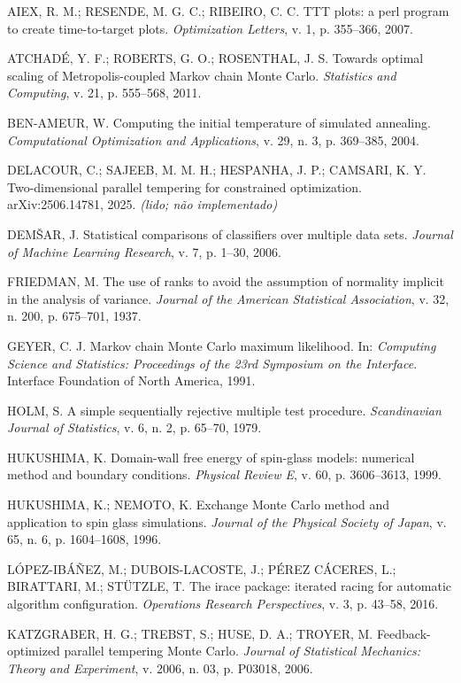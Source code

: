\documentclass[10pt,a4paper]{article}
\newenvironment{referencias}{\small\newcommand{\refitem}{\par\hangindent=7mm\hangafter=1 }}{\par}
\begin{document}
\begin{referencias}
 AIEX, R. M.; RESENDE, M. G. C.; RIBEIRO, C. C. TTT plots: a perl program to create time-to-target plots. \textit{Optimization Letters}, v. 1, p. 355–366, 2007.

 ATCHADÉ, Y. F.; ROBERTS, G. O.; ROSENTHAL, J. S. Towards optimal scaling of Metropolis-coupled Markov chain Monte Carlo. \textit{Statistics and Computing}, v. 21, p. 555–568, 2011.

 BEN-AMEUR, W. Computing the initial temperature of simulated annealing. \textit{Computational Optimization and Applications}, v. 29, n. 3, p. 369–385, 2004.

 DELACOUR, C.; SAJEEB, M. M. H.; HESPANHA, J. P.; CAMSARI, K. Y. Two-dimensional parallel tempering for constrained optimization. arXiv:2506.14781, 2025. \textit{(lido; não implementado)}

 DEMŠAR, J. Statistical comparisons of classifiers over multiple data sets. \textit{Journal of Machine Learning Research}, v. 7, p. 1–30, 2006.

 FRIEDMAN, M. The use of ranks to avoid the assumption of normality implicit in the analysis of variance. \textit{Journal of the American Statistical Association}, v. 32, n. 200, p. 675–701, 1937.

 GEYER, C. J. Markov chain Monte Carlo maximum likelihood. In: \textit{Computing Science and Statistics: Proceedings of the 23rd Symposium on the Interface}. Interface Foundation of North America, 1991.

 HOLM, S. A simple sequentially rejective multiple test procedure. \textit{Scandinavian Journal of Statistics}, v. 6, n. 2, p. 65–70, 1979.

 HUKUSHIMA, K. Domain-wall free energy of spin-glass models: numerical method and boundary conditions. \textit{Physical Review E}, v. 60, p. 3606–3613, 1999.

 HUKUSHIMA, K.; NEMOTO, K. Exchange Monte Carlo method and application to spin glass simulations. \textit{Journal of the Physical Society of Japan}, v. 65, n. 6, p. 1604–1608, 1996.

 LÓPEZ-IBÁÑEZ, M.; DUBOIS-LACOSTE, J.; PÉREZ CÁCERES, L.; BIRATTARI, M.; STÜTZLE, T. The irace package: iterated racing for automatic algorithm configuration. \textit{Operations Research Perspectives}, v. 3, p. 43–58, 2016.

 KATZGRABER, H. G.; TREBST, S.; HUSE, D. A.; TROYER, M. Feedback-optimized parallel tempering Monte Carlo. \textit{Journal of Statistical Mechanics: Theory and Experiment}, v. 2006, n. 03, p. P03018, 2006.


\end{referencias}
\end{document}
